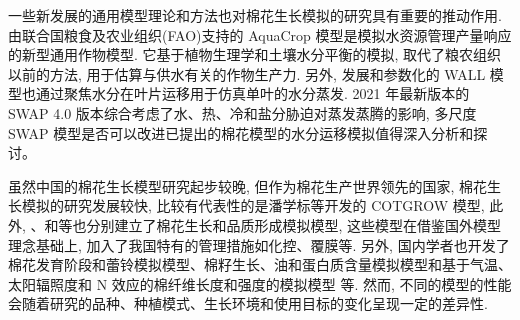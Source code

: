 \documentclass[a4paper,zihao=5]{ctexbook}
\begin{document}
一些新发展的通用模型理论和方法也对棉花生长模拟的研究具有重要的推动作用.
由联合国粮食及农业组织(FAO)支持的 AquaCrop 模型是模拟水资源管理产量响应的新型通用作物模型\cite{tan2018}.
它基于植物生理学和土壤水分平衡的模拟, 取代了粮农组织以前的方法, 用于估算与供水有关的作物生产力.
另外, 发展和参数化的 WALL 模型也通过聚焦水分在叶片运移用于仿真单叶的水分蒸发\cite{pachepsky2009}.
2021 年最新版本的 SWAP 4.0 版本\cite{swap2021}综合考虑了水、热、冷和盐分胁迫对蒸发蒸腾的影响, 多尺度 SWAP 模型是否可以改进已提出的棉花模型的水分运移模拟值得深入分析和探讨。

虽然中国的棉花生长模型研究起步较晚, 但作为棉花生产世界领先的国家,
棉花生长模拟的研究发展较快, 比较有代表性的是潘学标等开发的 COTGROW\cite{pan1996} 模型, 此外, \citet{zhang2003}、\citet{chen2006}和\citet{ma2004}等也分别建立了棉花生长和品质形成模拟模型, 这些模型在借鉴国外模型理念基础上, 加入了我国特有的管理措施如化控、覆膜等.
另外, 国内学者也开发了棉花发育阶段和蕾铃模拟模型\cite{ma2005}、棉籽生长、油和蛋白质含量模拟模型\cite{li2009}和基于气温、太阳辐照度和 N 效应的棉纤维长度和强度的模拟模型 \cite{zhao2012} 等.
然而, 不同的模型的性能会随着研究的品种、种植模式、生长环境和使用目标的变化呈现一定的差异性.
\end{document}
